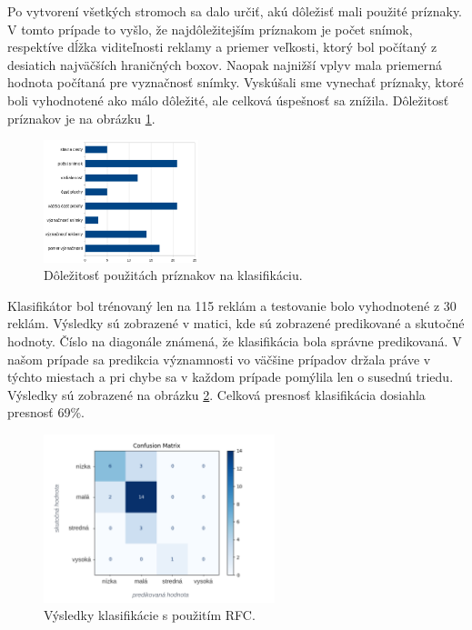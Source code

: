 Po vytvorení všetkých stromoch sa dalo určiť, akú dôležisť mali použité príznaky. V tomto prípade to vyšlo, že najdôležitejším príznakom je počet snímok, respektíve dĺžka viditeľnosti reklamy a priemer veľkosti, ktorý bol počítaný z desiatich najväčších hraničných boxov. Naopak najnižší vplyv mala priemerná hodnota počítaná pre vyznačnosť snímky. Vyskúšali sme vynechať príznaky, ktoré boli vyhodnotené ako málo dôležité, ale celková úspešnosť sa znížila. Dôležitosť príznakov je na obrázku \ref{img:imp}.

\begin{figure}[ht]
    \centering
    \includegraphics[width=0.4\textwidth]{images/05/chart2.png}
    \caption{Dôležitosť použitách príznakov na klasifikáciu.}
    \label{img:imp}
\end{figure}

Klasifikátor bol trénovaný len na 115 reklám a testovanie bolo vyhodnotené z 30 reklám. Výsledky sú zobrazené v matici, kde sú zobrazené predikované a skutočné hodnoty. Číslo na diagonále známená, že klasifikácia bola správne predikovaná. V našom prípade sa predikcia významnosti vo väčšine prípadov držala práve v týchto miestach a pri chybe sa v každom prípade pomýlila len o susednú triedu. Výsledky sú zobrazené na obrázku \ref{img:matrix}. Celková presnosť klasifikácia dosiahla presnosť 69\%.

\begin{figure}[ht]
    \centering
    \includegraphics[width=0.6\textwidth]{images/05/v3.png}
    \caption{Výsledky klasifikácie s použitím RFC.}
    \label{img:matrix}
\end{figure}

%
